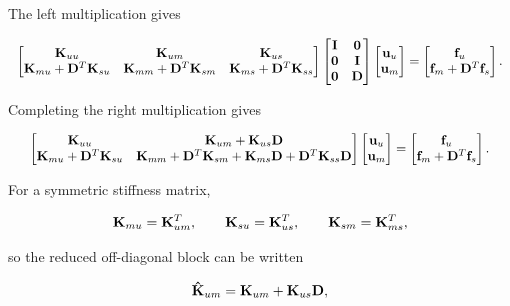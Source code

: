 The left multiplication gives

\begin{equation}
\scalebox{0.93}{$
\begin{bmatrix}
    \m{K}_{uu}&\m{K}_{um}&\m{K}_{us}\\
    \m{K}_{mu}+\m{D}^T\m{K}_{su}&
    \m{K}_{mm}+\m{D}^T\m{K}_{sm}&
    \m{K}_{ms}+\m{D}^T\m{K}_{ss}
\end{bmatrix}
\begin{bmatrix}
    \m{I}&\m{0}\\
    \m{0}&\m{I}\\
    \m{0}&\m{D}
\end{bmatrix}
\begin{bmatrix}\m{u}_u\\\m{u}_m\end{bmatrix}
=
\begin{bmatrix}\m{f}_u\\\m{f}_m+\m{D}^T\m{f}_s\end{bmatrix}.
$}
\end{equation}

Completing the right multiplication gives

\begin{equation}\label{rbe2-expanded-reduced-system}
\scalebox{0.93}{$
\begin{bmatrix}
    \m{K}_{uu}&\m{K}_{um}+\m{K}_{us}\m{D}\\
    \m{K}_{mu}+\m{D}^T\m{K}_{su}&
    \m{K}_{mm}+\m{D}^T\m{K}_{sm}
      +\m{K}_{ms}\m{D}+\m{D}^T\m{K}_{ss}\m{D}
\end{bmatrix}
\begin{bmatrix}\m{u}_u\\\m{u}_m\end{bmatrix}
=
\begin{bmatrix}\m{f}_u\\\m{f}_m+\m{D}^T\m{f}_s\end{bmatrix}.
$}
\end{equation}

For a symmetric stiffness matrix,

\begin{equation}
    \mathbf{K}_{mu}=\mathbf{K}_{um}^T,
    \qquad
    \mathbf{K}_{su}=\mathbf{K}_{us}^T,
    \qquad
    \mathbf{K}_{sm}=\mathbf{K}_{ms}^T,
\end{equation}

so the reduced off-diagonal block can be written

\begin{equation}
    \mathbf{\hat K}_{um}=\mathbf{K}_{um}+\mathbf{K}_{us}\mathbf{D},
\end{equation}

